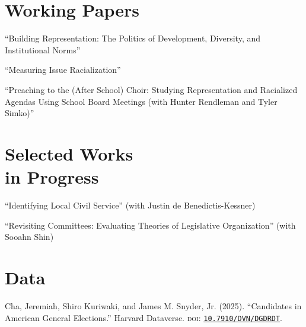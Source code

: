\documentclass[margin, line]{res}
\begin{document}
\begin{resume}
\section{Working Papers}
\begin{etaremune}
	\item ``Building Representation: The Politics of Development, Diversity, and
Institutional Norms''
	\item ``Measuring Issue Racialization''
	\item ``Preaching to the (After School) Choir: Studying Representation and Racialized Agendas Using School Board Meetings (with Hunter Rendleman and Tyler Simko)'' 
\end{etaremune}

\section{Selected Works \\in Progress}
\begin{etaremune}
	\item  ``Identifying Local Civil Service'' (with Justin de Benedictis-Kessner)
	\item ``Revisiting Committees: Evaluating Theories of Legislative Organization'' (with Sooahn Shin)
\end{etaremune}

\section{Data}
\begin{etaremune}
	\item Cha, Jeremiah, Shiro Kuriwaki, and James M. Snyder, Jr. (2025). ``Candidates in American General Elections.'' Harvard Dataverse. \textsc{doi}: \href{https://doi.org/10.7910/DVN/DGDRDT}{\texttt{10.7910/DVN/DGDRDT}}.
\end{etaremune}


\end{resume}
\end{document}
